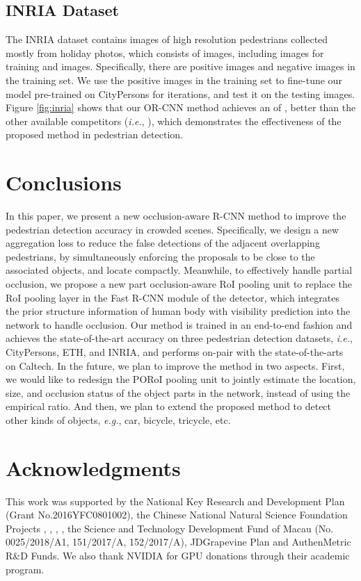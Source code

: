\documentclass[runningheads]{llncs}
\def\ie{{\em i.e.}}
\def\eg{{\em e.g.}}
\begin{document}
\subsection{INRIA Dataset}
The INRIA dataset \cite{DBLP:conf/cvpr/DalalT05} contains images of high resolution pedestrians collected mostly from holiday photos, which consists of  images, including  images for training and  images. Specifically, there are  positive images and  negative images in the training set. We use the  positive images in the training set to fine-tune our model pre-trained on CityPersons for  iterations, and test it on the  testing images. Figure \ref{fig:inria} shows that our OR-CNN method achieves an  of , better than the other available competitors (\ie, \cite{DBLP:conf/cvpr/DalalT05,DBLP:journals/ijcv/ViolaJ04,DBLP:conf/cvpr/BenensonMTG13,DBLP:conf/cvpr/ZhangBC14,DBLP:conf/eccv/PaisitkriangkraiSH14,DBLP:conf/eccv/ZhangLLH16,DBLP:conf/iccv/MathiasBTG13,DBLP:conf/iccv/MarinVLAL13,DBLP:conf/nips/NamDH14,DBLP:conf/cvpr/LimZD13,DBLP:conf/bmvc/YangWW15,DBLP:conf/bmvc/TocaCP15,DBLP:conf/cvpr/CosteaN14,DBLP:conf/cvpr/BenensonMTG12}), which demonstrates the effectiveness of the proposed method in pedestrian detection.


\section{Conclusions}
In this paper, we present a new occlusion-aware R-CNN method to improve the pedestrian detection accuracy in crowded scenes. Specifically, we design a new aggregation loss to reduce the false detections of the adjacent overlapping pedestrians, by simultaneously enforcing the proposals to be close to the associated objects, and locate compactly. Meanwhile, to effectively handle partial occlusion, we propose a new part occlusion-aware RoI pooling unit to replace the RoI pooling layer in the Fast R-CNN module of the detector, which integrates the prior structure information of human body with visibility prediction into the network to handle occlusion. Our method is trained in an end-to-end fashion and achieves the state-of-the-art accuracy on three pedestrian detection datasets, \ie, CityPersons, ETH, and INRIA, and performs on-pair with the state-of-the-arts on Caltech. In the future, we plan to improve the method in two aspects. First, we would like to redesign the PORoI pooling unit to jointly estimate the location, size, and occlusion status of the object parts in the network, instead of using the empirical ratio. And then, we plan to extend the proposed method to detect other kinds of objects, \eg, car, bicycle, tricycle, etc.

\section*{Acknowledgments}
This work was supported by the National Key Research and Development Plan (Grant No.2016YFC0801002), the Chinese National Natural Science Foundation Projects , , , , the Science and Technology Development Fund of Macau (No. 0025/2018/A1, 151/2017/A, 152/2017/A), JDGrapevine Plan and AuthenMetric R\&D Funds. We also thank NVIDIA for GPU donations through their academic program.



\end{document}
